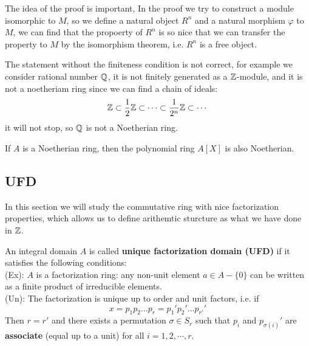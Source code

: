 \documentclass[12pt,a4paper]{article}
\begin{document}
The idea of the proof is important, In the proof we try to construct a module isomorphic to \(M\), so we define a natural object \(R^n\) and a natural morphism \(\varphi\) to \(M\), we can find that the propoerty of \(R^n\) is so nice that we can transfer the property to \(M\) by the isomorphism theorem, i.e. \(R^n\) is a free object.

The statement without the finiteness condition is not correct, for example we consider rational number \(\mathbb{Q}\), it is not finitely generated as a \(\mathbb{Z}\)-module, and it is not a noetheriam ring since we can find a chain of ideals:
\[\mathbb{Z} \subset \frac{1}{2}\mathbb{Z} \subset \cdots \subset \frac{1}{2^n}\mathbb{Z} \subset \cdots\]
it will not stop, so \(\mathbb{Q}\) is not a Noetherian ring.
\begin{theorem}
    If \(A\) is a Noetherian ring, then the polynomial ring \(A[X]\) is also Noetherian.
\end{theorem}

\subsection{UFD}
In this section we will study the commutative ring with nice factorization properties, which allows us to define arithemtic sturcture as what we have done in \(\mathbb{Z}\).

\begin{definitionplain}
    An integral domain \(A\) is called \textbf{unique factorization domain (UFD)} if it satisfies the following conditions:\\

    (Ex): \(A\) is a factorization ring: any non-unit element \(a \in A-\{0\}\) can be written as a finite product of irreducible elements.\\

    (Un): The factorization is unique up to order and unit factors, i.e. if
    \[x = p_1p_2\dots p_r = p_1'p_2'\dots  p_{r'}'\]
    Then \(r = r'\) and there exists a permutation \(\sigma \in S_r\) such that \(p_i\) and \(p_{\sigma(i)}'\) are \textbf{associate} (equal up to a unit) for all \(i=1,2,\cdots,r\).
\end{definitionplain}
\end{document}
